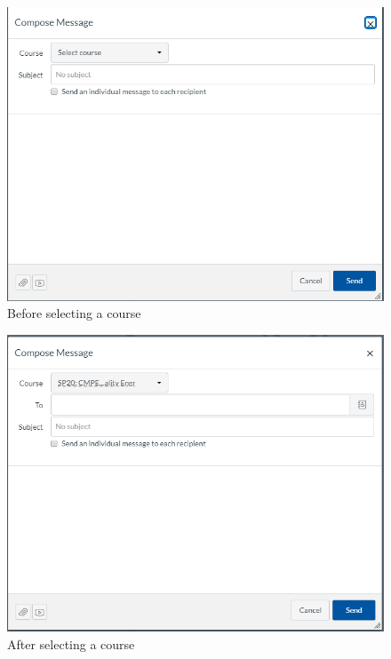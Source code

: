 \documentclass[10pt,letterpaper]{article}
\begin{document}
\begin{figure}[h!]
	\centerline{\includegraphics[width=12cm]{screenshots/compose-message-before-selecting-course.png}}
	\caption{Before selecting a course}
\end{figure}
\begin{figure}[h!]
	\centerline{\includegraphics[width=12cm]{screenshots/compose-message-after-selecting-course.png}}
	\caption{After selecting a course}
\end{figure}
\pagebreak
\end{document}
